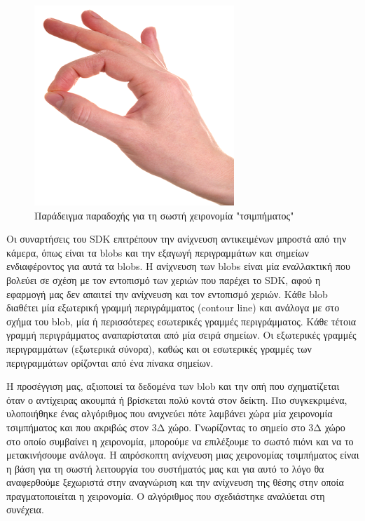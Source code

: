 \begin{figure}[H]
    \centering
    \includegraphics[scale=0.6, angle=0]{Files/Figures/correct_pinch.jpg}
    \caption[Παράδειγμα παραδοχής για τη σωστή χειρονομία "τσιμπήματος"]{Παράδειγμα παραδοχής για τη σωστή χειρονομία "τσιμπήματος"}
    \label{fig:gesture_rec}
\end{figure}



Οι συναρτήσεις του SDK επιτρέπουν την ανίχνευση αντικειμένων μπροστά από την κάμερα, όπως είναι τα blobs και την εξαγωγή περιγραμμάτων και σημείων ενδιαφέροντος για αυτά τα blobs. Η ανίχνευση των blobs είναι μία εναλλακτική που βολεύει σε σχέση με τον εντοπισμό των χεριών που παρέχει το SDK, αφού η εφαρμογή μας δεν απαιτεί την ανίχνευση και τον εντοπισμό χεριών. Κάθε blob διαθέτει μία εξωτερική γραμμή περιγράμματος (contour line) και ανάλογα με στο σχήμα του blob, μία ή περισσότερες εσωτερικές γραμμές περιγράμματος. Κάθε τέτοια γραμμή περιγράμματος αναπαρίσταται από μία σειρά σημείων. Οι εξωτερικές γραμμές περιγραμμάτων (εξωτερικά σύνορα), καθώς και οι εσωτερικές γραμμές των περιγραμμάτων ορίζονται από ένα πίνακα σημείων.


Η προσέγγιση μας, αξιοποιεί τα δεδομένα των blob και την οπή που σχηματίζεται όταν ο αντίχειρας ακουμπά ή βρίσκεται πολύ κοντά στον δείκτη. Πιο συγκεκριμένα, υλοποιήθηκε ένας αλγόριθμος που ανιχνεύει πότε λαμβάνει χώρα μία χειρονομία τσιμπήματος και που ακριβώς στον 3Δ χώρο. Γνωρίζοντας το σημείο στο 3Δ χώρο στο οποίο συμβαίνει η χειρονομία, μπορούμε να επιλέξουμε το σωστό πιόνι και να το μετακινήσουμε ανάλογα. Η απρόσκοπτη ανίχνευση μιας χειρονομίας τσιμπήματος είναι η βάση για τη σωστή λειτουργία του συστήματός μας και για αυτό το λόγο θα αναφερθούμε ξεχωριστά στην αναγνώριση και την ανίχνευση της θέσης στην οποία πραγματοποιείται η χειρονομία. Ο αλγόριθμος που σχεδιάστηκε αναλύεται στη συνέχεια.



